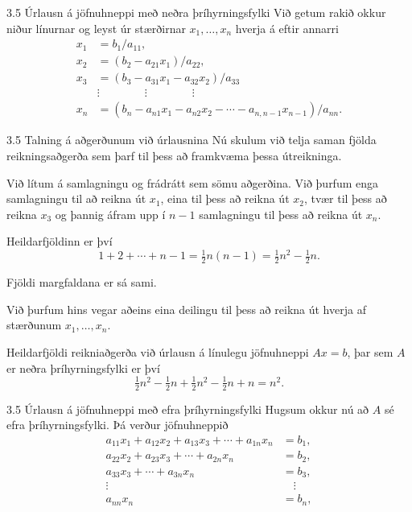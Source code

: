 \begin{frame}{3.5  Úrlausn á jöfnuhneppi með neðra þríhyrningsfylki} 
Við getum rakið okkur niður línurnar og leyst úr stærðirnar 
$x_1,\dots,x_n$ hverja á eftir annarri
\begin{align*}
	x_1& = b_1/a_{11},\\
	x_2& = (b_2-a_{21}x_1)/a_{22},\\
	x_3& = (b_3-a_{31}x_1-a_{32}x_2)/a_{33}\\
   	&\vdots \qquad \qquad \vdots \qquad \qquad \vdots\\
	x_n& = (b_n-a_{n1}x_1-a_{n2}x_2-\cdots
		-a_{n,n-1}x_{n-1})/a_{nn}.
\end{align*}
\end{frame}


\begin{frame}{3.5  Talning á aðgerðunum við úrlausnina} 
Nú skulum við telja saman fjölda reikningsaðgerða sem þarf til þess
að framkvæma þessa útreikninga.

\pause
\smallskip
Við lítum á samlagningu og frádrátt sem sömu aðgerðina. 
Við þurfum enga samlagningu til að reikna út $x_1$,
eina til þess að reikna út $x_2$, tvær til þess að reikna $x_3$ 
og þannig áfram upp í $n-1$ samlagningu til þess að reikna út $x_n$. 

\pause
\smallskip
Heildarfjöldinn er því 
\begin{equation*}
	1 + 2 + \cdots + n-1 = \tfrac 12 n(n-1) = 
	\tfrac 12n^2-\tfrac 12 n.
\end{equation*}

\pause
Fjöldi margfaldana er sá sami. 


\pause
Við þurfum hins vegar aðeins eina deilingu til þess að reikna út
hverja af  stærðunum $x_1,\dots,x_n$. 

\pause 
Heildarfjöldi reikniaðgerða við úrlausn á línulegu jöfnuhneppi
$Ax=b$, þar sem $A$ er neðra  þríhyrningsfylki er því 
$$\tfrac 12 n^2 - \tfrac 12 n
+ \tfrac 12 n^2 - \tfrac 12 n +n = n^2.$$ 
\end{frame}


\begin{frame}{3.5 Úrlausn á jöfnuhneppi með efra þríhyrningsfylki} 
Hugsum okkur nú að $A$ sé efra þríhyrningsfylki.  Þá verður
jöfnuhneppið
\begin{align*}
	a_{11}x_1+a_{12}x_2+a_{13}x_3+\cdots+a_{1n}x_n& = b_1,\\
	a_{22}x_2+a_{23}x_3+\cdots+a_{2n}x_n& = b_2,\\
	a_{33}x_3+\cdots+a_{3n}x_n& = b_3,\\
	\vdots\quad& \quad \vdots\\
	a_{nn}x_n& = b_n,
\end{align*}

\end{frame}



